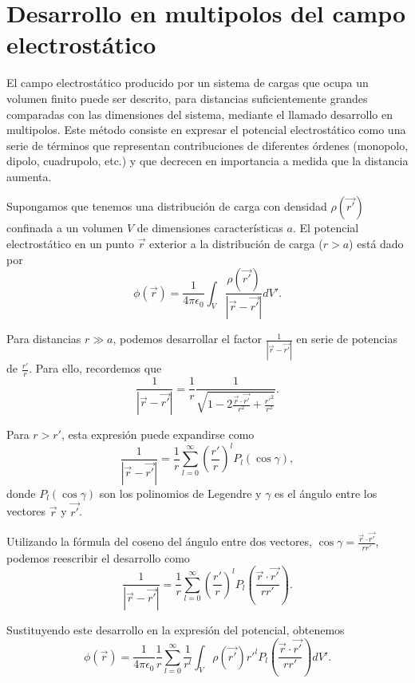\documentclass[12pt,a4paper]{book}
\begin{document}
\section{Desarrollo en multipolos del campo electrostático}

El campo electrostático producido por un sistema de cargas que ocupa un volumen finito puede ser descrito, para distancias suficientemente grandes comparadas con las dimensiones del sistema, mediante el llamado desarrollo en multipolos. Este método consiste en expresar el potencial electrostático como una serie de términos que representan contribuciones de diferentes órdenes (monopolo, dipolo, cuadrupolo, etc.) y que decrecen en importancia a medida que la distancia aumenta.

Supongamos que tenemos una distribución de carga con densidad $\rho(\vec{r'})$ confinada a un volumen $V$ de dimensiones características $a$. El potencial electrostático en un punto $\vec{r}$ exterior a la distribución de carga ($r > a$) está dado por
\begin{equation}
\phi(\vec{r}) = \frac{1}{4\pi\epsilon_0}\int_V \frac{\rho(\vec{r'})}{|\vec{r} - \vec{r'}|} dV'.
\end{equation}

Para distancias $r \gg a$, podemos desarrollar el factor $\frac{1}{|\vec{r} - \vec{r'}|}$ en serie de potencias de $\frac{r'}{r}$. Para ello, recordemos que
\begin{equation}
\frac{1}{|\vec{r} - \vec{r'}|} = \frac{1}{r}\frac{1}{\sqrt{1 - 2\frac{\vec{r}\cdot\vec{r'}}{r^2} + \frac{r'^2}{r^2}}}.
\end{equation}

Para $r > r'$, esta expresión puede expandirse como
\begin{equation}
\frac{1}{|\vec{r} - \vec{r'}|} = \frac{1}{r}\sum_{l=0}^{\infty}\left(\frac{r'}{r}\right)^l P_l(\cos\gamma),
\end{equation}
donde $P_l(\cos\gamma)$ son los polinomios de Legendre y $\gamma$ es el ángulo entre los vectores $\vec{r}$ y $\vec{r'}$.

Utilizando la fórmula del coseno del ángulo entre dos vectores, $\cos\gamma = \frac{\vec{r}\cdot\vec{r'}}{rr'}$, podemos reescribir el desarrollo como
\begin{equation}
\frac{1}{|\vec{r} - \vec{r'}|} = \frac{1}{r}\sum_{l=0}^{\infty}\left(\frac{r'}{r}\right)^l P_l\left(\frac{\vec{r}\cdot\vec{r'}}{rr'}\right).
\end{equation}

Sustituyendo este desarrollo en la expresión del potencial, obtenemos
\begin{equation}
\phi(\vec{r}) = \frac{1}{4\pi\epsilon_0}\frac{1}{r}\sum_{l=0}^{\infty}\frac{1}{r^l}\int_V \rho(\vec{r'})r'^l P_l\left(\frac{\vec{r}\cdot\vec{r'}}{rr'}\right) dV'.
\end{equation}
\end{document}
